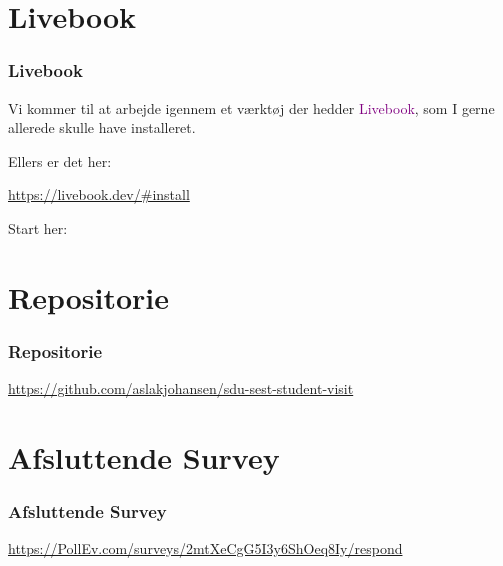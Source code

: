 \section{Livebook}
\begin{frame}
    \frametitle{Livebook}
    \vspace{5mm}
    Vi kommer til at arbejde igennem et værktøj der hedder \textcolor{purple}{Livebook}, som I gerne allerede skulle have installeret.
    
    \vspace{7mm}
    Ellers er det her:
    \begin{center}
      \url{https://livebook.dev/\#install}
    \end{center}
    
    \vspace{7mm}
    Start her:
    \begin{center}
    \end{center}
\end{frame}

\section{Repositorie}
\begin{frame}
    \frametitle{Repositorie}
    \begin{center}
    
      \vspace{4mm}
      \url{https://github.com/aslakjohansen/sdu-sest-student-visit}
    \end{center}
\end{frame}

\section{Afsluttende Survey}
\begin{frame}
    \frametitle{Afsluttende Survey}
    \begin{center}
    
      \vspace{4mm}
      \url{https://PollEv.com/surveys/2mtXeCgG5I3y6ShOeq8Iy/respond}
    \end{center}
\end{frame}

